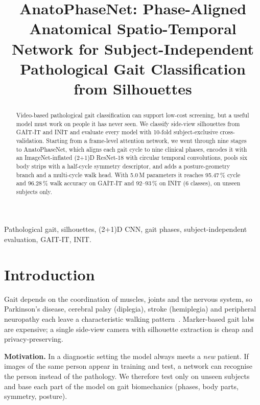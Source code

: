 \documentclass[conference]{IEEEtran}
\begin{document}
\title{AnatoPhaseNet: Phase-Aligned Anatomical Spatio-Temporal Network for
Subject-Independent Pathological Gait Classification from Silhouettes}

\author{
}

\maketitle

\begin{abstract}
Video-based pathological gait classification can support low-cost
screening, but a useful model must work on people it has never seen. We
classify side-view silhouettes from GAIT-IT and INIT and evaluate every model
with 10-fold subject-exclusive cross-validation. Starting from a frame-level
attention network, we went through nine stages to AnatoPhaseNet, which aligns
each gait cycle to nine clinical phases, encodes it with an ImageNet-inflated
(2+1)D ResNet-18 with circular temporal convolutions, pools six body strips with
a half-cycle symmetry descriptor, and adds a posture-geometry branch and a
multi-cycle walk head. With 5.0\,M parameters it
reaches 95.47\,\% cycle and 96.28\,\% walk accuracy on GAIT-IT and 92--93\,\%
on INIT (6 classes), on unseen subjects only.
\end{abstract}

\begin{IEEEkeywords}
Pathological gait, silhouettes, (2+1)D CNN, gait phases, subject-independent
evaluation, GAIT-IT, INIT.
\end{IEEEkeywords}

\section{Introduction}
Gait depends on the coordination of muscles, joints and the nervous system, so
Parkinson's disease, cerebral palsy (diplegia), stroke (hemiplegia) and
peripheral neuropathy each leave a characteristic walking
pattern~\cite{baker2018}. Marker-based gait labs are expensive; a single
side-view camera with silhouette extraction is cheap and privacy-preserving.

\textbf{Motivation.} In a diagnostic setting the model always meets a
\emph{new} patient. If images of the same person appear in training and test,
a network can recognise the person instead of the pathology. We therefore
test only on unseen subjects and base each part of the model on gait
biomechanics (phases, body parts, symmetry, posture).
\end{document}
